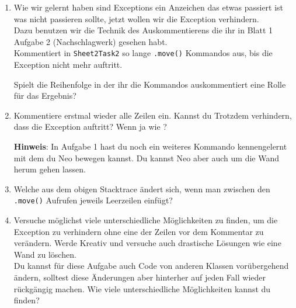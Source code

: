 \begin{enumerate}[label=\alph*)]
    \item Wie wir gelernt haben sind Exceptions ein Anzeichen das etwas passiert ist was nicht passieren sollte, jetzt wollen wir die Exception verhindern.\\
        Dazu benutzen wir die Technik des Auskommentierens die ihr in Blatt 1 Aufgabe 2 (Nachschlagwerk) gesehen habt.\\
        Kommentiert in \lstinline{Sheet2Task2} so lange \lstinline{.move()} Kommandos aus, bis die Exception nicht mehr auftritt.

        Spielt die Reihenfolge in der ihr die Kommandos auskommentiert eine Rolle für das Ergebnis?
    \item Kommentiere erstmal wieder alle Zeilen ein.
        Kannst du Trotzdem verhindern, dass die Exception auftritt?
        Wenn ja wie ?

    \textbf{Hinweis}: In Aufgabe 1 hast du noch ein weiteres Kommando kennengelernt mit dem du Neo bewegen kannst.
        Du kannst Neo aber auch um die Wand herum gehen lassen.
    \item \optional Welche  aus dem obigen Stacktrace ändert sich, wenn man zwischen den \lstinline{.move()} Aufrufen jeweils Leerzeilen einfügt?
    \item \optional Versuche möglichst viele unterschiedliche Möglichkeiten zu finden, um die Exception zu verhindern ohne eine der Zeilen vor dem Kommentar zu verändern.
        Werde Kreativ und versuche auch drastische Lösungen wie eine Wand zu löschen.\\
        Du kannst für diese Aufgabe auch Code von anderen Klassen vorübergehend ändern, solltest diese Änderungen aber hinterher auf jeden Fall wieder rückgängig machen.
        Wie viele unterschiedliche Möglichkeiten kannst du finden?
\end{enumerate}
 

